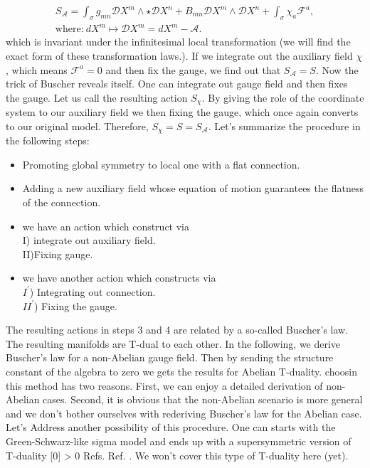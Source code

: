 \documentclass[a4paper]{article}
\renewcommand{\cite}[1]{%
\begingroup
\def\tempx{0}%
  \StrCount{#1}{,}[\tempx]%
  \ifnum\tempx > 0 
  Refs. %
  \else
  Ref. %
  \fi
\endgroup
\origcite{#1}%
}
\begin{document}
\begin{align}
S_{\mathcal{A}} =  \int_\sigma g_{m n} \mathcal{D} X^m \wedge \star \mathcal{D} X^n + B_{m n} \mathcal{D} X^m \wedge \mathcal{D} X^n + \int_{\sigma} \chi_a \mathcal{F}^a,
\\ \nonumber
\text{where:} ~ dX^m \mapsto \mathcal{D}X^m = d X^m - \mathcal{A}.
\end{align}
which is invariant under the infinitesimal local transformation (we will find the exact form of these transformation laws.). If we integrate out the auxiliary field $\chi$, which means $ \mathcal{F}^a=0$ and then fix the gauge, we find out that $S_{\mathcal{A}} =S$.
Now the trick of Buscher reveals itself. One can integrate out gauge field and then fixes the gauge. Let us call the resulting action $S_{\chi}$. By giving the role of the coordinate system to our auxiliary field we then fixing the gauge, which once again converts to our original model. Therefore, $S_{\chi}=S=S_{\mathcal{A}}$.
Let's summarize the procedure in the following steps:

\begin{itemize}

\item Promoting global symmetry to local one with a flat connection.
\item Adding a new auxiliary field whose equation of motion guarantees the flatness of the connection.

 \item we have an action which construct via
\\							
 I) integrate out auxiliary field.\\
  II)Fixing gauge.
						
 \item we have another action which constructs via\\
$I^{\prime}$) Integrating out connection.\\
$II^{\prime}$) Fixing the gauge.
\end{itemize}
The resulting actions in steps 3 and 4 are related by a so-called Buscher's law. The resulting manifolds are T-dual to each other. In the following, we derive Buscher's law for a non-Abelian gauge field. Then by sending the structure constant of the algebra to zero we gets the results for Abelian T-duality. choosin this method has two reasons. First, we can enjoy a detailed derivation of non-Abelian cases. Second, it is obvious that the non-Abelian scenario is more general and we don't bother ourselves with rederiving Buscher's law for the Abelian case. Let's Address another possibility of this procedure. One can starts with the Green-Schwarz-like sigma model and ends up with a supersymmetric version of T-duality \cite{fermionic}. We won't cover this type of T-duality here (yet).
\end{document}
